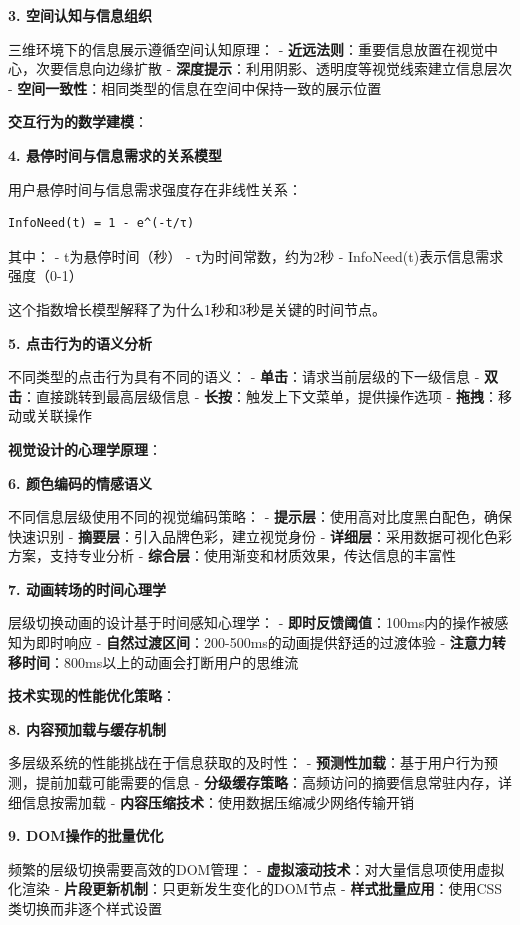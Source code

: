 \textbf{3. 空间认知与信息组织}

三维环境下的信息展示遵循空间认知原理： - \textbf{近远法则}：重要信息放置在视觉中心，次要信息向边缘扩散 - \textbf{深度提示}：利用阴影、透明度等视觉线索建立信息层次 - \textbf{空间一致性}：相同类型的信息在空间中保持一致的展示位置

\textbf{交互行为的数学建模}：

\textbf{4. 悬停时间与信息需求的关系模型}

用户悬停时间与信息需求强度存在非线性关系：

\begin{lstlisting}
InfoNeed(t) = 1 - e^(-t/τ)
\end{lstlisting}

其中： - t为悬停时间（秒） - τ为时间常数，约为2秒 - InfoNeed(t)表示信息需求强度（0-1）

这个指数增长模型解释了为什么1秒和3秒是关键的时间节点。

\textbf{5. 点击行为的语义分析}

不同类型的点击行为具有不同的语义： - \textbf{单击}：请求当前层级的下一级信息 - \textbf{双击}：直接跳转到最高层级信息 - \textbf{长按}：触发上下文菜单，提供操作选项 - \textbf{拖拽}：移动或关联操作

\textbf{视觉设计的心理学原理}：

\textbf{6. 颜色编码的情感语义}

不同信息层级使用不同的视觉编码策略： - \textbf{提示层}：使用高对比度黑白配色，确保快速识别 - \textbf{摘要层}：引入品牌色彩，建立视觉身份 - \textbf{详细层}：采用数据可视化色彩方案，支持专业分析 - \textbf{综合层}：使用渐变和材质效果，传达信息的丰富性

\textbf{7. 动画转场的时间心理学}

层级切换动画的设计基于时间感知心理学： - \textbf{即时反馈阈值}：100ms内的操作被感知为即时响应 - \textbf{自然过渡区间}：200-500ms的动画提供舒适的过渡体验 - \textbf{注意力转移时间}：800ms以上的动画会打断用户的思维流

\textbf{技术实现的性能优化策略}：

\textbf{8. 内容预加载与缓存机制}

多层级系统的性能挑战在于信息获取的及时性： - \textbf{预测性加载}：基于用户行为预测，提前加载可能需要的信息 - \textbf{分级缓存策略}：高频访问的摘要信息常驻内存，详细信息按需加载 - \textbf{内容压缩技术}：使用数据压缩减少网络传输开销

\textbf{9. DOM操作的批量优化}

频繁的层级切换需要高效的DOM管理： - \textbf{虚拟滚动技术}：对大量信息项使用虚拟化渲染 - \textbf{片段更新机制}：只更新发生变化的DOM节点 - \textbf{样式批量应用}：使用CSS类切换而非逐个样式设置

